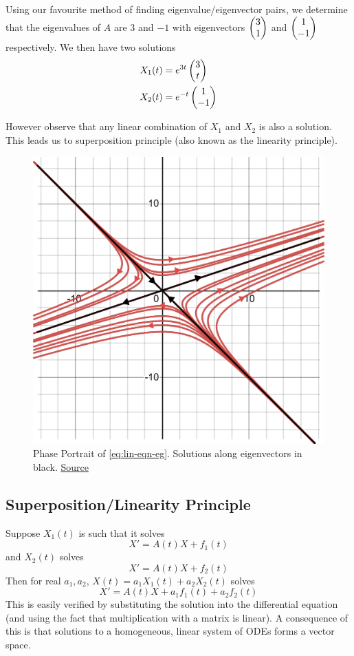Using our favourite method of finding eigenvalue/eigenvector pairs, we determine that the eigenvalues of $A$ are $3$ and $-1$ with eigenvectors $\begin{pmatrix} 3\\1 \end{pmatrix}$ and $\begin{pmatrix} 1\\-1 \end{pmatrix}$ respectively. We then have two solutions
\begin{align*}
    X_1(t) &= e^{3t}\begin{pmatrix} 3\\t \end{pmatrix}\\
    X_2(t) &= e^{-t}\begin{pmatrix} 1\\-1 \end{pmatrix}
\end{align*}

However observe that any linear combination of $X_1$ and $X_2$ is also a solution. This leads us to superposition principle (also known as the linearity principle).

\begin{figure}[ht]
    \centering
    \includegraphics[scale=0.35]{Images/saddle_point.png}
    \caption{Phase Portrait of \autoref{eq:lin-eqn-eg}. Solutions along eigenvectors in black. \href{https://www.desmos.com/calculator/olr55ghiwv}{Source} }
    \label{fig:phase-portrait-eg}
\end{figure}

\subsection{Superposition/Linearity Principle} \label{sec:superposition-principle}
Suppose $X_1(t)$ is such that it solves
$$ X' = A(t)X + f_1(t) $$
and $X_2(t)$ solves
$$ X' = A(t)X + f_2(t) $$
Then for real $a_1, a_2$, $X(t) = a_1 X_1(t) + a_2 X_2 (t)$ solves
$$ X' = A(t)X + a_1 f_1(t) + a_2 f_2(t) $$
This is easily verified by substituting the solution into the differential equation (and using the fact that multiplication with a matrix is linear). A consequence of this is that solutions to a homogeneous, linear system of ODEs forms a vector space. 


